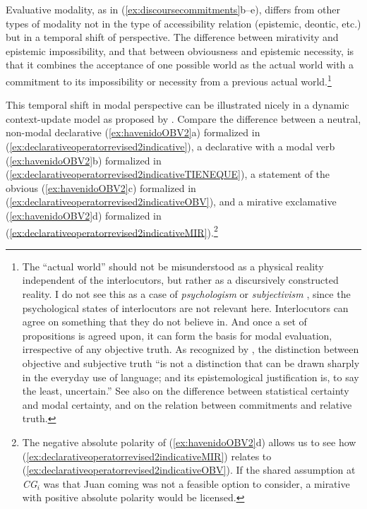 Evaluative modality, as in (\ref{ex:discoursecommitments}b–e), differs from other types of modality not in the type of accessibility relation (epistemic, deontic, etc.) but in a temporal shift of perspective. The difference between mirativity and epistemic impossibility, and that between obviousness and epistemic necessity, is that it combines the acceptance of one possible world as the actual world with a commitment to its impossibility or necessity from a previous actual world.\footnote{The ``actual world'' should not be misunderstood as a physical reality independent of the interlocutors, but rather as a discursively constructed reality. I do not see this as a case of \textit{psychologism} \citep[4--5]{BradleySwartz.1979} or \textit{subjectivism} \citep[122--129]{Portner.2009}, since the psychological states of interlocutors are not relevant here. Interlocutors can agree on something that they do not believe in. And once a set of propositions is agreed upon, it can form the basis for modal evaluation, irrespective of any objective truth. As recognized by \citet[797]{Lyons.1977}, the distinction between objective and subjective truth ``is not a distinction that can be drawn sharply in the everyday use of language; and its epistemological justification is, to say the least, uncertain.'' See also \citet[73--74]{Portner.2009} on the difference between statistical certainty and modal certainty, and \citet{MacFarlane.2014} on the relation between commitments and relative truth.}

This temporal shift in modal perspective can be illustrated nicely in a dynamic context-update model as proposed by \citet{FarkasBruce.2010}. Compare the difference between a neutral, non-modal declarative (\ref{ex:havenidoOBV2}a) formalized in (\ref{ex:declarativeoperatorrevised2indicative}), a declarative with a modal verb (\ref{ex:havenidoOBV2}b) formalized in (\ref{ex:declarativeoperatorrevised2indicativeTIENEQUE}), a statement of the obvious (\ref{ex:havenidoOBV2}c) formalized in (\ref{ex:declarativeoperatorrevised2indicativeOBV}), and a mirative exclamative (\ref{ex:havenidoOBV2}d) formalized in (\ref{ex:declarativeoperatorrevised2indicativeMIR}).\footnote{The negative absolute polarity of (\ref{ex:havenidoOBV2}d) allows us to see how (\ref{ex:declarativeoperatorrevised2indicativeMIR}) relates to (\ref{ex:declarativeoperatorrevised2indicativeOBV}). If the shared assumption at \textit{CG}$_i$ was that Juan coming was not a feasible option to consider, a mirative with positive absolute polarity would be licensed.} 

